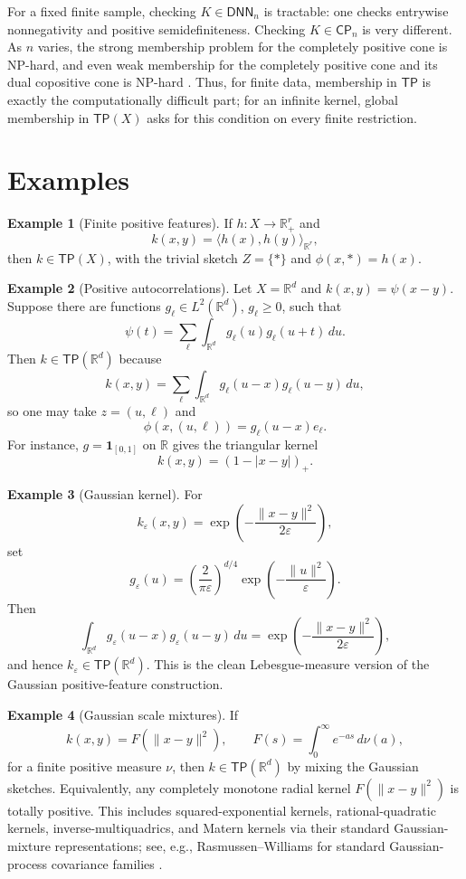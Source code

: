 \documentclass[11pt]{article}
\newcommand{\R}{\mathbb{R}}
\newcommand{\Rp}{\mathbb{R}_{+}}
\newcommand{\DNN}{\mathsf{DNN}}
\newcommand{\CP}{\mathsf{CP}}
\newcommand{\TP}{\mathsf{TP}}
\theoremstyle{definition}
\newtheorem{example}{Example}
\theoremstyle{plain}
\theoremstyle{remark}
\begin{document}
For a fixed finite sample, checking $K\in\DNN_n$ is tractable: one checks
entrywise nonnegativity and positive semidefiniteness.  Checking
$K\in\CP_n$ is very different.  As $n$ varies, the strong membership problem
for the completely positive cone is NP-hard, and even weak membership for the
completely positive cone and its dual copositive cone is NP-hard
\cite{DickinsonGijben2014}.  Thus, for finite data, membership in $\TP$ is
exactly the computationally difficult part; for an infinite kernel, global
membership in $\TP(X)$ asks for this condition on every finite restriction.

\section{Examples}

\begin{example}[Finite positive features]
If $h:X\to\Rp^r$ and
\[
k(x,y)=\langle h(x),h(y)\rangle_{\R^r},
\]
then $k\in\TP(X)$, with the trivial sketch $Z=\{\ast\}$ and
$\phi(x,\ast)=h(x)$.
\end{example}

\begin{example}[Positive autocorrelations]
Let $X=\R^d$ and $k(x,y)=\psi(x-y)$.  Suppose there are functions
$g_\ell\in L^2(\R^d)$, $g_\ell\ge0$, such that
\[
\psi(t)=\sum_\ell \int_{\R^d} g_\ell(u)g_\ell(u+t)\,du.
\]
Then $k\in\TP(\R^d)$ because
\[
k(x,y)=\sum_\ell \int_{\R^d} g_\ell(u-x)g_\ell(u-y)\,du,
\]
so one may take $z=(u,\ell)$ and
\[
\phi(x,(u,\ell))=g_\ell(u-x)e_\ell.
\]
For instance, $g=\mathbf{1}_{[0,1]}$ on $\R$ gives the triangular kernel
\[
k(x,y)=(1-|x-y|)_+.
\]
\end{example}

\begin{example}[Gaussian kernel]
For
\[
k_\varepsilon(x,y)=\exp\!\left(-\frac{\|x-y\|^2}{2\varepsilon}\right),
\]
set
\[
g_\varepsilon(u)=\left(\frac{2}{\pi\varepsilon}\right)^{d/4}
\exp\!\left(-\frac{\|u\|^2}{\varepsilon}\right).
\]
Then
\[
\int_{\R^d} g_\varepsilon(u-x)g_\varepsilon(u-y)\,du
=
\exp\!\left(-\frac{\|x-y\|^2}{2\varepsilon}\right),
\]
and hence $k_\varepsilon\in\TP(\R^d)$.  This is the clean Lebesgue-measure
version of the Gaussian positive-feature construction.
\end{example}

\begin{example}[Gaussian scale mixtures]
If
\[
k(x,y)=F(\|x-y\|^2),
\qquad
F(s)=\int_0^\infty e^{-as}\,d\nu(a),
\]
for a finite positive measure $\nu$, then $k\in\TP(\R^d)$ by mixing the Gaussian
sketches.  Equivalently, any completely monotone radial kernel
$F(\|x-y\|^2)$ is totally positive.  This includes squared-exponential kernels,
rational-quadratic kernels, inverse-multiquadrics, and Matern kernels via their
standard Gaussian-mixture representations; see, e.g., Rasmussen--Williams for
standard Gaussian-process covariance families \cite{RasmussenWilliams2006}.
\end{example}
\end{document}
